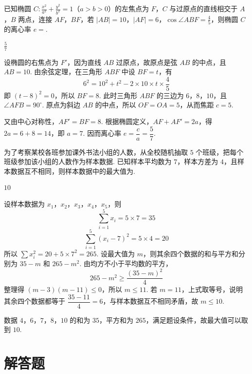 \begin{problem}
已知椭圆 \(C:\frac{x^2}{a^2} + \frac{y^2}{b^2} = 1\)（\(a > b > 0\)）的左焦点为 \(F\)，\(C\) 与过原点的直线相交于 \(A\)，\(B\) 两点，连接 \(AF\)，\(BF\)，若 \(|AB| = 10\)，\(|AF| = 6\)，\(\cos \angle ABF = \frac{4}{5}\)，则椭圆 \(C\) 的离心率 \(e =\)\fillinblank{}.
\end{problem}

\begin{answer}
\(\frac{5}{7}\)
\end{answer}

\begin{solution}
设椭圆的右焦点为 \(F'\)，因为直线 \(AB\) 过原点，故原点是弦 \(AB\) 的中点，且 \(AB=10\). 由余弦定理，在三角形 \(ABF\) 中设 \(BF=t\)，有
\[
6^2=10^2+t^2-2\times10\times t\times\frac45
\]
即 \((t-8)^2=0\)，所以 \(BF=8\). 此时三角形 \(ABF\) 的三边为 \(6\)，\(8\)，\(10\)，且 \(\angle AFB=90^\circ\). 原点为斜边 \(AB\) 的中点，所以 \(OF=OA=5\)，从而焦距 \(c=5\).

又由中心对称性，\(AF'=BF=8\). 根据椭圆定义，\(AF+AF'=2a\)，得 \(2a=6+8=14\)，即 \(a=7\). 因而离心率
\(e=\dfrac ca=\dfrac57\).
\end{solution}

\begin{problem}
为了考察某校各班参加课外书法小组的人数，从全校随机抽取 \(5\) 个班级，把每个班级参加该小组的人数作为样本数据. 已知样本平均数为 \(7\)，样本方差为 \(4\)，且样本数据互不相同，则样本数据中的最大值为\fillinblank{}.
\end{problem}

\begin{answer}
\(10\)
\end{answer}

\begin{solution}
设样本数据为 \(x_1\)，\(x_2\)，\(x_3\)，\(x_4\)，\(x_5\)，则
\[
\sum_{i=1}^5x_i=5\times7=35
\]
\[
\sum_{i=1}^5(x_i-7)^2=5\times4=20
\]
所以 \(\sum x_i^2=20+5\times7^2=265\). 设最大值为 \(m\)，则其余四个数据的和与平方和分别为 \(35-m\) 和 \(265-m^2\). 由均方不小于平均数的平方，
\[
265-m^2\geqslant\frac{(35-m)^2}{4}
\]
整理得 \((m-3)(m-11)\leqslant0\)，所以 \(m\leqslant11\). 若 \(m=11\)，上式取等号，说明其余四个数据都等于 \(\dfrac{35-11}{4}=6\)，与样本数据互不相同矛盾，故 \(m\leqslant10\).

数据 \(4\)，\(6\)，\(7\)，\(8\)，\(10\) 的和为 \(35\)，平方和为 \(265\)，满足题设条件，故最大值可以取到 \(10\).
\end{solution}

\section{解答题}

